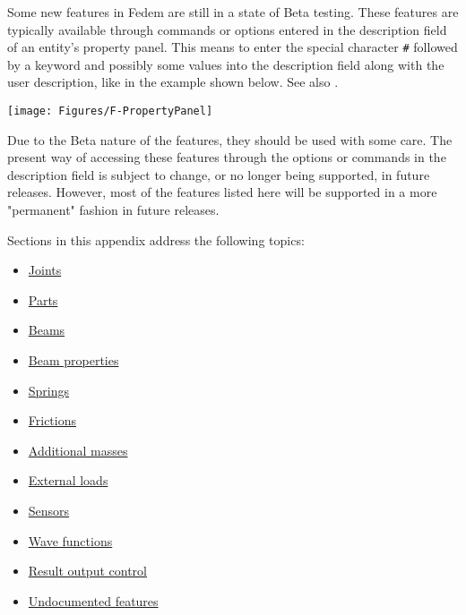 %
%

%
%

\def\LinkFormatText#1{
  \medskip
  {\raggedright\tt#1}
  \medskip}

\def\LinkFormatTextNoSkip#1{{\raggedright\tt#1}}

\def\Variable#1{\textless#1\textgreater}



Some new features in Fedem are still in a state of Beta testing.
These features are typically available through commands or options
entered in the description field of an entity's property panel.
This means to enter the special character {\tt\#} followed by a keyword and
possibly some values into the description field along with the user description,
like in the example shown below. See also
.

\texttt{[image: Figures/F-PropertyPanel]}

Due to the Beta nature of the features, they should be used with some care.
The present way of accessing these features through the options or commands in
the description field is subject to change, or no longer being supported,
in future releases. However, most of the features listed here will be supported
in a more "permanent" fashion in future releases.

Sections in this appendix address the following topics:

\begin{itemize}
\item\protect\hyperlink{joints-1}{Joints}
\item\protect\hyperlink{parts-1}{Parts}
\item\protect\hyperlink{beams-1}{Beams}
\item\protect\hyperlink{beam-properties-1}{Beam properties}
\item\protect\hyperlink{springs}{Springs}
\item\protect\hyperlink{frictions-1}{Frictions}
\item\protect\hyperlink{additional-masses}{Additional masses}
\item\protect\hyperlink{external-loads}{External loads}
\item\protect\hyperlink{sensors-1}{Sensors}
\item\protect\hyperlink{wave-functions}{Wave functions}
\item\protect\hyperlink{result-output-control-2}{Result output control}
\item\protect\hyperlink{undocumented-features}{Undocumented features}
\end{itemize}


